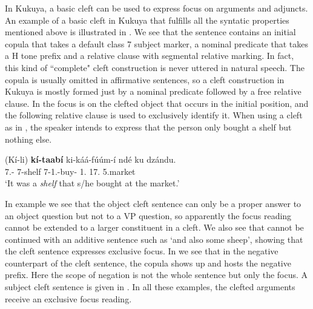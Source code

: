 \documentclass[output=paper,colorlinks,citecolor=brown,
]{langscibook}
\begin{document}
In Kukuya, a basic cleft can be used to express focus on arguments and adjuncts. An example of a basic cleft in Kukuya that fulfills all the syntatic properties mentioned above is illustrated in . We see that the sentence contains an initial copula that takes a default class 7 subject marker, a nominal predicate that takes a H tone prefix and a relative clause with segmental relative marking. In fact, this kind of ``complete" cleft construction is never uttered in natural speech. The copula is usually omitted in affirmative sentences, so a cleft construction in Kukuya is mostly formed just by a nominal predicate followed by a free relative clause. In  the focus is on the clefted object that occurs in the initial position, and the following relative clause is used to exclusively identify it. When using a cleft as in , the speaker intends to express that the person only bought a shelf but nothing else.
\begin{exe}
\ex
\label{136}
\gll
(Kí-li) \textbf{kí-taabí} ki-káá-fúúm-í ndé ku dzándu.\\
7\Sm{}.\Pst{}-\Cop{} 7-shelf 7\Rel{}-1\Sm{}.\Pst{}-buy-\Pst{} 1.\Pro{} 17.\Loc{} 5.market\\
\trans ‘It was a \textit{shelf} that s/he bought at the market.’

\end{exe}
In example  we see that the object cleft sentence can only be a proper answer to an object question but not to a VP question, so apparently the focus reading cannot be extended to a larger constituent in a cleft. We also see that  cannot be continued with an additive sentence such as `and also some sheep', showing that the cleft sentence expresses exclusive focus. In  we see that in the negative counterpart of the cleft sentence, the copula shows up and hosts the negative prefix. Here the scope of negation is not the whole sentence but only the focus. A subject cleft sentence is given in . In all these examples, the clefted arguments receive an exclusive focus reading.
\end{document}
